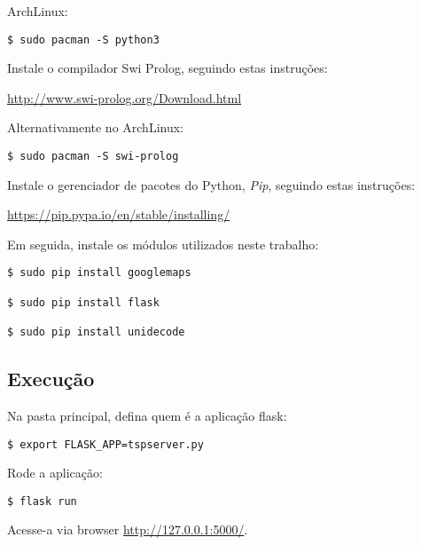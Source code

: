 \documentclass[12pt,a4paper]{article}
\begin{document}
ArchLinux:
\begin{verbatim}
$ sudo pacman -S python3
\end{verbatim}

Instale o compilador Swi Prolog, seguindo estas instruções:

\url{http://www.swi-prolog.org/Download.html}

Alternativamente no ArchLinux:
\begin{verbatim}
$ sudo pacman -S swi-prolog
\end{verbatim}

Instale o gerenciador de pacotes do Python,  \emph{Pip}, seguindo estas instruções: 

\url{https://pip.pypa.io/en/stable/installing/}

Em seguida, instale os módulos utilizados neste trabalho:
\begin{verbatim}
$ sudo pip install googlemaps

$ sudo pip install flask

$ sudo pip install unidecode
\end{verbatim}
\subsection{Execução}

Na pasta principal, defina quem é a aplicação flask:
\begin{verbatim}
$ export FLASK_APP=tspserver.py
\end{verbatim}

Rode a aplicação:
\begin{verbatim}
$ flask run
\end{verbatim}

Acesse-a via browser \url{http://127.0.0.1:5000/}.
\end{document}
